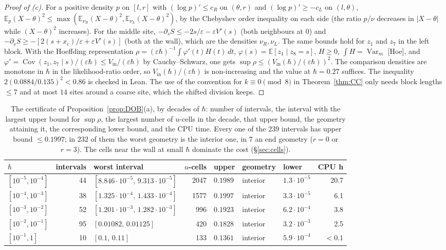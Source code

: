 \documentclass[11pt,a4paper]{article}
\theoremstyle{definition}
\theoremstyle{remark}
\newcommand{\E}{\mathbb{E}}
\newcommand{\Var}{\operatorname{Var}}
\newcommand{\Cov}{\operatorname{Cov}}
\newcommand{\xc}{x_c}
\begin{document}
\begin{proof}[Proof of \textup{(c)}]
For a positive density $p$ on $[l,r]$ with $(\log p)'\le c_R$ on $(\theta,r)$ and $(\log p)'\ge-c_L$ on $(l,\theta)$, $\E_p(X-\theta)^2\le\max(\E_{\nu_R}(X-\theta)^2,\E_{\nu_L}(X-\theta)^2)$, by the Chebyshev order inequality on each side (the ratio $p/\nu$ decreases in $|X-\theta|$ while $(X-\theta)^2$ increases). For the middle site, $-\partial_sS\le-2s/\varepsilon-\varepsilon V'(s)$ (both neighbours at $0$) and $-\partial_sS\ge-[2(s+\xc)/\varepsilon+\varepsilon V'(s)]$ (both at the wall), which are the densities $\nu_R,\nu_L$. The same bounds hold for $z_1$ and $z_7$ in the left block. With the Hoeffding representation $\rho=(\varepsilon\hbar)^{-1}\int\varphi'(t)H(t)\,dt$, $\varphi(s)=\E[z_1\mid z_8=s]$, $H\ge0$, $\int H=\Var_m$ [Hoe], and $\varphi'=\Cov(z_1,z_7\mid s)/(\varepsilon\hbar)\le V_{\mathrm{in}}/(\varepsilon\hbar)$ by Cauchy--Schwarz, one gets $\sup\rho\le(V_{\mathrm{in}}(\hbar)/(\varepsilon\hbar))^2$. The comparison densities are monotone in $\hbar$ in the likelihood-ratio order, so $V_{\mathrm{in}}(\hbar)/(\varepsilon\hbar)$ is non-increasing and the value at $\hbar=0.27$ suffices. The inequality $2(0.0884/0.135)^2<0.86$ is checked in Lean. The use of the convention for $k\equiv0\pmod8$ in Theorem~\ref{thm:CC} only needs block lengths $\le7$ and at most $14$ sites around a coarse site, which the shifted division keeps.
\end{proof}

\begin{table}[ht]
\centering\small
\setlength{\tabcolsep}{4pt}\begin{tabular}{@{}lrlrlllr@{}}
\toprule
$\hbar$ & intervals & worst interval & $u$-cells & upper & geometry & lower & CPU h\\
\midrule
$[10^{-5},10^{-4}]$ & 44 & $[8.846\cdot10^{-5},\,9.313\cdot10^{-5}]$ & 2047 & $0.1989$ & interior & $1.3\cdot10^{-5}$ & 20.7\\
$[10^{-4},10^{-3}]$ & 38 & $[1.325\cdot10^{-4},\,1.433\cdot10^{-4}]$ & 1577 & $0.1997$ & interior & $3.3\cdot10^{-5}$ & 6.1\\
$[10^{-3},10^{-2}]$ & 52 & $[1.201\cdot10^{-3},\,1.282\cdot10^{-3}]$ & 996 & $0.1923$ & interior & $6.2\cdot10^{-4}$ & 3.8\\
$[10^{-2},10^{-1}]$ & 95 & $[0.01082,\,0.01125]$ & 420 & $0.1828$ & interior & $3.2\cdot10^{-3}$ & 2.5\\
$[10^{-1},1]$ & 10 & $[0.1,\,0.11]$ & 133 & $0.1361$ & interior & $5.9\cdot10^{-4}$ & $<0.1$\\
\bottomrule
\end{tabular}
\caption{The certificate of Proposition~\ref{prop:DOB}(a), by decades of $\hbar$: number of intervals, the interval with the largest upper bound for $\sup\rho$, the largest number of $u$-cells in the decade, that upper bound, the geometry attaining it, the corresponding lower bound, and the CPU time. Every one of the $239$ intervals has upper bound $\le0.1997$; in $232$ of them the worst geometry is the interior one, in $7$ an end geometry ($r=0$ or $r=3$). The cells near the wall at small $\hbar$ dominate the cost (\S\ref{sec:cells}).}
\label{tab:cert}
\end{table}
\end{document}
